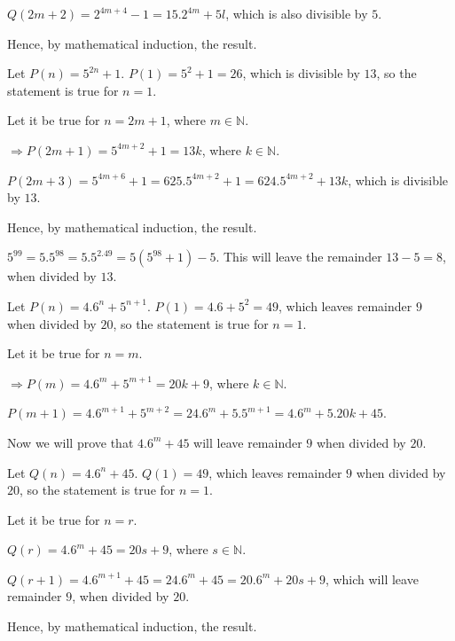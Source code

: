   $Q(2m + 2) = 2^{4m + 4} - 1 = 15.2^{4m} + 5l$, which is also divisible by $5$.

  Hence, by mathematical induction, the result.
\item Let $P(n) = 5^{2n} + 1$. $P(1) = 5^2 + 1 = 26$, which is divisible by $13$, so the statement is true
  for $n = 1$.

  Let it be true for $n = 2m + 1$, where $m\in\mathbb{N}$.

  $\Rightarrow P(2m + 1) = 5^{4m + 2} + 1 = 13k$, where $k\in\mathbb{N}$.

  $P(2m + 3) = 5^{4m + 6} + 1 = 625.5^{4m + 2} + 1 = 624.5^{4m + 2} + 13k$, which is divisible by $13$.

  Hence, by mathematical induction, the result.

  $5^{99} = 5.5^{98} = 5.5^{2.49} = 5(5^{98} + 1) - 5$. This will leave the remainder $13 - 5 = 8$, when
  divided by $13$.
\item Let $P(n) = 4.6^n + 5^{n + 1}$. $P(1) = 4.6 + 5^2 = 49$, which leaves remainder $9$ when divided by
  $20$, so the statement is true for $n = 1$.

  Let it be true for $n = m$.

  $\Rightarrow P(m) = 4.6^m + 5^{m + 1} = 20k + 9$, where $k\in\mathbb{N}$.

  $P(m + 1) = 4.6^{m + 1} + 5^{m + 2} = 24.6^m + 5.5^{m + 1} = 4.6^m + 5.20k + 45$.

  Now we will prove that $4.6^m + 45$ will leave remainder $9$ when divided by $20$.

  Let $Q(n) = 4.6^n + 45$. $Q(1) = 49$, which leaves remainder $9$ when divided by $20$, so the statement is
  true for $n = 1$.

  Let it be true for $n = r$.

  $Q(r) = 4.6^m + 45 = 20s + 9$, where $s\in\mathbb{N}$.

  $Q(r + 1) = 4.6^{m + 1} + 45 = 24.6^m + 45 = 20.6^m + 20s + 9$, which will leave remainder $9$, when
  divided by $20$.

  Hence, by mathematical induction, the result.
\item
\stopitemize
